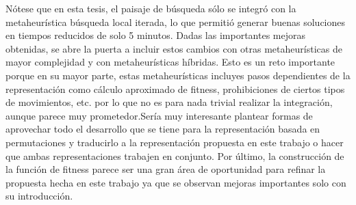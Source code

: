 
Nótese que en esta tesis, el paisaje de búsqueda sólo se integró con la metaheurística búsqueda local iterada, lo que permitió generar buenas soluciones en tiempos reducidos de solo 5 minutos. Dadas las importantes mejoras obtenidas, se abre la puerta a incluir estos cambios con otras metaheurísticas de mayor complejidad y con metaheurísticas híbridas. Esto es un reto importante porque en su mayor parte, estas metaheurísticas incluyes pasos dependientes de la representación como cálculo aproximado de fitness, prohibiciones de ciertos tipos de movimientos, etc. por lo que no es para nada trivial realizar la integración, aunque parece muy prometedor.Sería muy interesante plantear formas de aprovechar todo el desarrollo que se tiene para la representación basada en permutaciones y traducirlo a la representación propuesta en este trabajo o hacer que ambas representaciones trabajen en conjunto. 
 Por último, la construcción de la función de fitness parece ser una gran área de oportunidad para refinar la propuesta hecha en este trabajo ya que se observan mejoras importantes solo con su introducción. 
